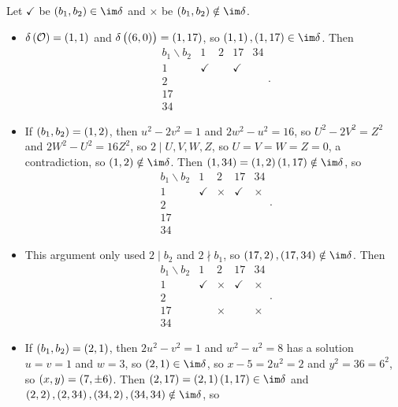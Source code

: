 \begin{example}
\begin{itemize}
\pagebreak

Let $ \checkmark $ be $ \br{b_1, b_2} \in \im \delta $ and $ \times $ be $ \br{b_1, b_2} \notin \im \delta $.
\begin{itemize}
\item $ \delta\br{\OOO} = \br{1, 1} $ and $ \delta\br{\br{6, 0}} = \br{1, 17} $, so $ \br{1, 1}, \br{1, 17} \in \im \delta $. Then
$$
\begin{array}{c|cccc}
b_1 \backslash b_2 & 1 & 2 & 17 & 34 \\
\hline
1 & \checkmark & & \checkmark & \\
2 & & & & \\
17 & & & & \\
34 & & & &
\end{array}.
$$
\item If $ \br{b_1, b_2} = \br{1, 2} $, then $ u^2 - 2v^2 = 1 $ and $ 2w^2 - u^2 = 16 $, so $ U^2 - 2V^2 = Z^2 $ and $ 2W^2 - U^2 = 16Z^2 $, so $ 2 \mid U, V, W, Z $, so $ U = V = W = Z = 0 $, a contradiction, so $ \br{1, 2} \notin \im \delta $. Then $ \br{1, 34} = \br{1, 2}\br{1, 17} \notin \im \delta $, so
$$
\begin{array}{c|cccc}
b_1 \backslash b_2 & 1 & 2 & 17 & 34 \\
\hline
1 & \checkmark & \times & \checkmark & \times \\
2 & & & & \\
17 & & & & \\
34 & & & &
\end{array}.
$$
\item This argument only used $ 2 \mid b_2 $ and $ 2 \nmid b_1 $, so $ \br{17, 2}, \br{17, 34} \notin \im \delta $. Then
$$
\begin{array}{c|cccc}
b_1 \backslash b_2 & 1 & 2 & 17 & 34 \\
\hline
1 & \checkmark & \times & \checkmark & \times \\
2 & & & & \\
17 & & \times & & \times \\
34 & & & &
\end{array}.
$$
\item If $ \br{b_1, b_2} = \br{2, 1} $, then $ 2u^2 - v^2 = 1 $ and $ w^2 - u^2 = 8 $ has a solution $ u = v = 1 $ and $ w = 3 $, so $ \br{2, 1} \in \im \delta $, so $ x - 5 = 2u^2 = 2 $ and $ y^2 = 36 = 6^2 $, so $ \br{x, y} = \br{7, \pm 6} $. Then $ \br{2, 17} = \br{2, 1}\br{1, 17} \in \im \delta $ and $ \br{2, 2}, \br{2, 34}, \br{34, 2}, \br{34, 34} \notin \im \delta $, so
$$
\begin{array}{c|cccc}

\end{array}$$
\end{itemize}
\end{itemize}
\end{example}
